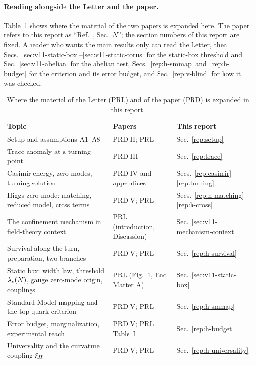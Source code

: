 \paragraph{Reading alongside the Letter and the paper.}
Table~\ref{tab:guide-map} shows where the material of the two papers is expanded here.
The paper refers to this report as ``Ref.~\cite{v12Report}, Sec.~$N$''; the section numbers of this report are fixed.
A reader who wants the main results only can read the Letter, then Secs.~\ref{sec:v11-static-box}--\ref{sec:v11-static-torus} for the static-box threshold and Sec.~\ref{sec:v11-abelian} for the abelian test, Secs.~\ref{rep:h-smmap} and~\ref{rep:h-budget} for the criterion and its error budget, and Sec.~\ref{rep:v-blind} for how it was checked.

\begin{table}[ht]
\centering
\small
\caption{Where the material of the Letter (PRL) and of the paper (PRD) is expanded in this report.}
\label{tab:guide-map}
\begin{tabular}{@{}p{}p{}p{}@{}}
\toprule
Topic & Papers & This report \\
\midrule
Setup and assumptions A1--A8 & PRD II; PRL & Sec.~\ref{rep:setup} \\
Trace anomaly at a turning point & PRD III & Sec.~\ref{rep:trace} \\
Casimir energy, zero modes, turning solution & PRD IV and appendices & Secs.~\ref{rep:casimir}--\ref{rep:turning} \\
Higgs zero mode: matching, reduced model, cross terms & PRD V; PRL & Secs.~\ref{rep:h-matching}--\ref{rep:h-cross} \\
The confinement mechanism in field-theory context & PRL (introduction, Discussion) & Sec.~\ref{sec:v11-mechanism-context} \\
Survival along the turn, preparation, two branches & PRD V; PRL & Sec.~\ref{rep:h-survival} \\
Static box: width law, threshold $\lambda_c(N)$, gauge zero-mode origin, couplings & PRL (Fig.~1, End Matter A) & Sec.~\ref{sec:v11-static-box} \\
Standard Model mapping and the top-quark criterion & PRD V; PRL & Sec.~\ref{rep:h-smmap} \\
Error budget, marginalization, experimental reach & PRD V; PRL Table~I & Sec.~\ref{rep:h-budget} \\
Universality and the curvature coupling $\xi_H$ & PRD V; PRL & Sec.~\ref{rep:h-universality} \\

\end{tabular}
\end{table}
